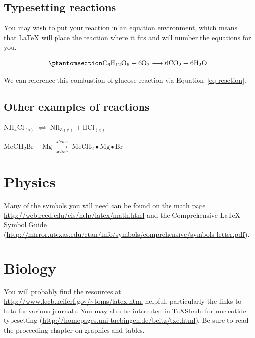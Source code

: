 \documentclass[
  letterpaper,
  12pt,
  twoside]{reedthesis}
\begin{document}
\subsection{Typesetting reactions}\label{typesetting-reactions}

You may wish to put your reaction in an equation environment, which
means that LaTeX will place the reaction where it fits and will number
the equations for you.

\begin{equation}\phantomsection\label{eq-reaction}{
\mathrm{C_6H_{12}O_6  + 6O_2} \longrightarrow \mathrm{6CO_2 + 6H_2O}
}\end{equation}

We can reference this combustion of glucose reaction via
Equation~\ref{eq-reaction}.

\subsection{Other examples of
reactions}\label{other-examples-of-reactions}

\(\mathrm{NH_4Cl_{(s)}}\) \(\rightleftharpoons\)
\(\mathrm{NH_{3(g)}+HCl_{(g)}}\)

\noindent \(\mathrm{MeCH_2Br + Mg}\) \(\xrightarrow[below]{above}\)
\(\mathrm{MeCH_2\bullet Mg \bullet Br}\)

\section{Physics}\label{physics}

Many of the symbols you will need can be found on the math page
\url{http://web.reed.edu/cis/help/latex/math.html} and the Comprehensive
LaTeX Symbol Guide
(\url{http://mirror.utexas.edu/ctan/info/symbols/comprehensive/symbols-letter.pdf}).

\section{Biology}\label{biology}

You will probably find the resources at
\url{http://www.lecb.ncifcrf.gov/~toms/latex.html} helpful, particularly
the links to bsts for various journals. You may also be interested in
TeXShade for nucleotide typesetting
(\url{http://homepages.uni-tuebingen.de/beitz/txe.html}). Be sure to
read the proceeding chapter on graphics and tables.

\end{document}
